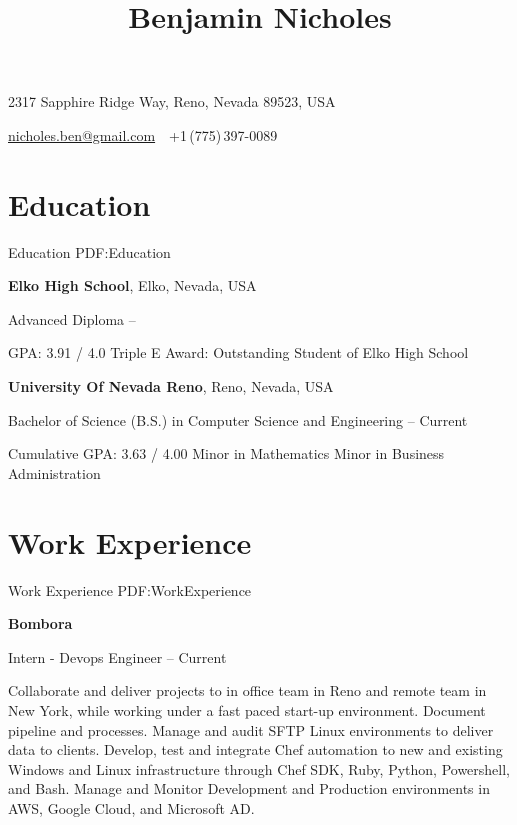 \documentclass[a4paper,10pt,oneside]{article}
\begin{document}
\thispagestyle{empty}


\title{Benjamin Nicholes}

\begin{subtitle}
{2317 Sapphire Ridge Way, Reno, Nevada 89523, USA}
\par
\href{mailto:nicholes.ben@gmail.com}
{nicholes.ben@gmail.com}
\,\BulletSymbol\,
+1\,(775)\,397-0089
\end{subtitle}

\begin{body}


\section
{Education}
{Education}
{PDF:Education}


{\textbf{Elko High School}},
Elko, Nevada, USA

Advanced Diploma
\hfill
{} --
\begin{detail}
\BulletItem
GPA: 3.91 / 4.0
\BulletItem
Triple E Award: Outstanding Student of Elko High School
\end{detail}

\EntryGap
{\textbf{University Of Nevada Reno}},
Reno, Nevada, USA
\par
Bachelor of Science (B.S.) in 
{Computer Science and Engineering}
\hfill
{} --
Current
\begin{detail}
\BulletItem
Cumulative GPA: 3.63 / 4.00
\BulletItem
Minor in 
{Mathematics}
\BulletItem
Minor in
{Business Administration}
\end{detail}



\section
{Work Experience}
{Work Experience}
{PDF:WorkExperience}

{\textbf{Bombora}}
\par
Intern - Devops Engineer
\hfill
{} --
Current
\begin{detail}
\BulletItem
Collaborate and deliver projects to in office team in Reno and remote team in \newline 
New York, while working under a fast paced start-up environment. Document \newline pipeline and processes.
\BulletItem
Manage and audit SFTP Linux environments to deliver data to clients.
\BulletItem
Develop, test and integrate Chef automation to new and existing Windows and Linux \newline infrastructure through Chef SDK, Ruby, Python, Powershell, and Bash.
\BulletItem
 Manage and Monitor Development and Production environments in AWS, Google Cloud, \newline and Microsoft AD.
\end{detail}


\end{body}
\end{document}
